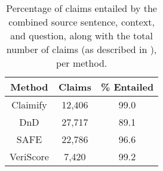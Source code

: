 \begin{table}[ht]
\centering
\renewcommand{\arraystretch}{1.3}
\begin{tabular}{ccc}
    \hline
    \textbf{Method} & \textbf{Claims} & \textbf{\% Entailed} \\
    \hline
    Claimify  & 12,406  & 99.0 \\
    DnD       & 27,717  & 89.1 \\
    SAFE      & 22,786  & 96.6 \\
    VeriScore & 7,420   & 99.2 \\
    \hline
\end{tabular}
\caption{Percentage of claims entailed by the combined source sentence, context, and question, along with the total number of claims (as described in ), per method.}
\label{tab:entailment}
\end{table}